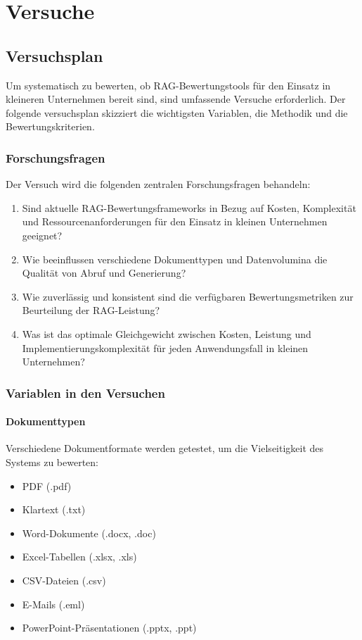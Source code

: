 \chapter{Versuche}

\section{Versuchsplan}

Um systematisch zu bewerten, ob RAG-Bewertungstools für den Einsatz in kleineren Unternehmen bereit sind, sind umfassende Versuche erforderlich. Der folgende versuchsplan skizziert die wichtigsten Variablen, die Methodik und die Bewertungskriterien.

\subsection{Forschungsfragen}

Der Versuch wird die folgenden zentralen Forschungsfragen behandeln:

\begin{enumerate}
    \item Sind aktuelle RAG-Bewertungsframeworks in Bezug auf Kosten, Komplexität und Ressourcenanforderungen für den Einsatz in kleinen Unternehmen geeignet?
    \item Wie beeinflussen verschiedene Dokumenttypen und Datenvolumina die Qualität von Abruf und Generierung?
    \item Wie zuverlässig und konsistent sind die verfügbaren Bewertungsmetriken zur Beurteilung der RAG-Leistung?
    \item Was ist das optimale Gleichgewicht zwischen Kosten, Leistung und Implementierungskomplexität für jeden Anwendungsfall in kleinen Unternehmen?
\end{enumerate}

\subsection{Variablen in den Versuchen}

\subsubsection{Dokumenttypen}
Verschiedene Dokumentformate werden getestet, um die Vielseitigkeit des Systems zu bewerten:
\begin{itemize}
    \item PDF (.pdf)
    \item Klartext (.txt)
    \item Word-Dokumente (.docx, .doc)
    \item Excel-Tabellen (.xlsx, .xls)
    \item CSV-Dateien (.csv)
    \item E-Mails (.eml)
    \item PowerPoint-Präsentationen (.pptx, .ppt)
\end{itemize}

